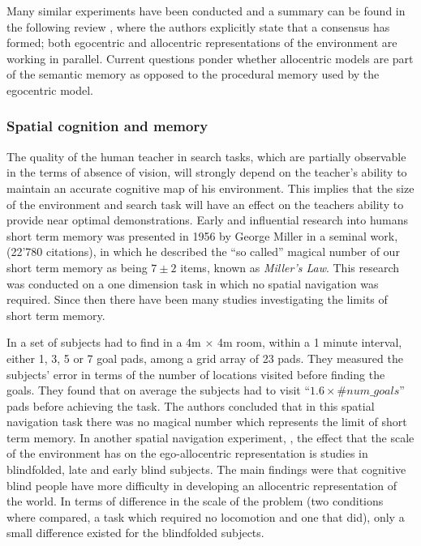 Many similar experiments have been conducted and a summary can be found in the following review \cite{spatial_memory_how_ego_allo_combine_2006},
where the authors explicitly state that a consensus has formed; both egocentric and allocentric representations of the environment are 
working in parallel. Current questions ponder whether allocentric models are part of the semantic memory as opposed to the procedural 
memory used by the egocentric model.

\subsubsection{Spatial cognition and memory}

The quality of the human teacher in  search tasks, which are partially observable in the terms of absence of vision,
will strongly depend on the teacher's ability to maintain an accurate cognitive map of his environment. This implies
that the size of the environment and search task will have an effect on the teachers ability to provide near optimal 
demonstrations. 
Early and influential research into humans short term memory was presented in 1956 by George Miller in a seminal work, \cite{cogprints730} 
(22'780 citations), in which he described the ``so called'' magical number of our short term memory as being $7\pm2$ items, 
known as \textit{Miller's Law}. This research was conducted on a one dimension task in which no spatial navigation was required.
Since then there have been many studies investigating the limits of short term memory.

In \cite{human_stsm_2015} a set of subjects had to find in a 4m $\times$ 4m room, within a 1 minute interval, either 1, 3, 5 or 7 goal pads, 
among a grid array of 23 pads. They measured the subjects' error in terms of the number of locations visited before finding the goals. 
They found that on average the subjects had to visit ``$1.6 \times \#num\_goals$'' pads before achieving the task. The authors concluded 
that in this spatial navigation task there was no magical number which represents the limit of short term memory.
In another spatial navigation experiment, \cite{Iachini2014}, the effect that the scale of the environment 
has on the ego-allocentric representation is studies in blindfolded, late and early blind subjects. The main findings were
that cognitive blind people have more difficulty in developing an allocentric representation of the world. In terms of 
difference in the scale of the problem (two conditions where compared, a task which required no locomotion and one that did), 
only a small difference existed for the blindfolded subjects.

